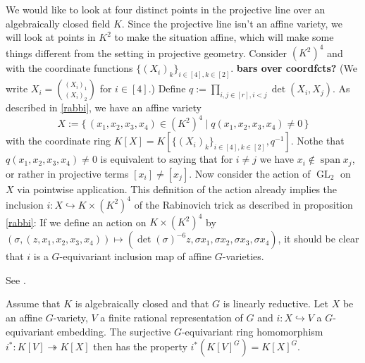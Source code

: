 \begin{dexample}
  We would like to look at four distinct points in the projective line over an algebraically closed field $K$.
  Since the projective line isn't an affine variety, we will look at points in $K^2$ to make the situation affine, which will make some things different from the setting in projective geometry.
  Consider $(K^2)^4$ and with the coordinate functions $\{(X_i)_k\}_{i \in [4], k \in [2]}$. \textbf{bars over coordfcts?}
  (We write $X_i = \binom{(X_i)_1}{(X_i)_2}$ for $i \in [4]$.)
  Define $q := \prod_{i,j \in [r], i<j} \operatorname{det}(X_i,X_j)$.
  As described in \ref{rabbi}, we have an affine variety
  \begin{equation}
    X := \{\, (x_1,x_2,x_3,x_4) \in (K^2)^4 \mid q(x_1,x_2,x_3,x_4) \neq 0 \,\}
  \end{equation}
  with the coordinate ring $K[X] = K[\{(X_i)_k\}_{i \in [4], k \in [2]},q^{-1}]$.
  Nothe that $q(x_1,x_2,x_3,x_4) \neq 0$ is equivalent to saying that for $i\neq j$ we have $x_i \notin \operatorname{span}{x_j}$, or rather in projective terms $[x_i] \neq [x_j]$.
  Now consider the action of $\operatorname{GL}_2$ on $X$ via pointwise application.
  This definition of the action already implies the inclusion $i \colon X \hookrightarrow K \times (K^2)^4$ of the Rabinovich trick as described in proposition \ref{rabbi}:
  If we define an action on $K \times (K^2)^4$ by $(\sigma,(z,x_1,x_2,x_3,x_4)) \mapsto (\operatorname{det}(\sigma)^{-6}z,\sigma x_1,\sigma x_2,\sigma x_3,\sigma x_4)$, it should be clear that $i$ is a $G$-equivariant inclusion map of affine $G$-varieties.
\end{dexample}

\begin{lemma}\label{foremb}
  See \cite[2.2.9]{DK15}.
  
  Assume that $K$ is algebraically closed and that $G$ is linearly reductive.
  Let $X$ be an affine $G$-variety, $V$ a finite rational representation of $G$ and $i \colon X \hookrightarrow V$ a $G$-equivariant embedding.
  The surjective $G$-equivariant ring homomorphism $i^\ast \colon K[V] \twoheadrightarrow K[X]$ then has the property $i^\ast (K[V]^G) = K[X]^G$.
\end{lemma}

